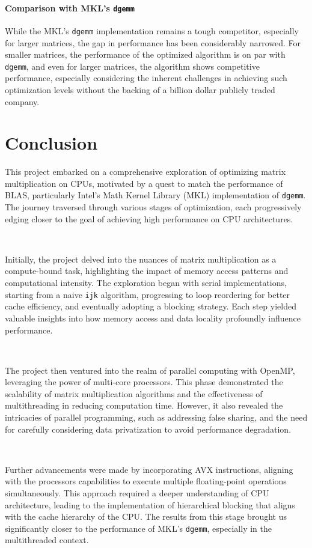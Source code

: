 \documentclass{article}
\begin{document}
\paragraph*{Comparison with MKL's \texttt{dgemm}} While the MKL's \texttt{dgemm} implementation 
remains a tough competitor, especially for larger matrices, 
the gap in performance has been considerably narrowed. For smaller matrices, the performance 
of the optimized algorithm is on par with \texttt{dgemm}, and even for larger matrices, 
the algorithm shows competitive performance, especially considering the inherent challenges in achieving such optimization levels 
without the backing of a billion dollar publicly traded company.

\section{Conclusion}
This project embarked on a comprehensive exploration of optimizing matrix multiplication on CPUs, 
motivated by a quest to match the performance of BLAS, particularly Intel's Math Kernel Library (MKL) 
implementation of \texttt{dgemm}. The journey traversed through various stages of optimization, 
each progressively edging closer to the goal of achieving high performance on CPU architectures.

\

\noindent Initially, the project delved into the nuances of matrix multiplication as a compute-bound task, 
highlighting the impact of memory access patterns and computational intensity. The exploration began 
with serial implementations, starting from a naive \texttt{ijk} algorithm, progressing to 
loop reordering for better cache efficiency, and eventually adopting a blocking strategy. 
Each step yielded valuable insights into how memory access and data locality profoundly influence performance.

\

\noindent The project then ventured into the realm of parallel computing with OpenMP, 
leveraging the power of multi-core processors. This phase demonstrated the scalability of matrix multiplication 
algorithms and the effectiveness of multithreading in reducing computation time. However, it also revealed the intricacies 
of parallel programming, such as addressing false sharing, and the need for carefully considering data privatization to 
avoid performance degradation.

\

\noindent Further advancements were made by incorporating AVX instructions, aligning with the processors capabilities to 
execute multiple floating-point operations simultaneously. This approach required a deeper understanding of CPU architecture, 
leading to the implementation of hierarchical blocking that aligns with the cache hierarchy of the CPU. The results from 
this stage brought us significantly closer to the performance of MKL's \texttt{dgemm}, especially in the multithreaded context.
\end{document}
